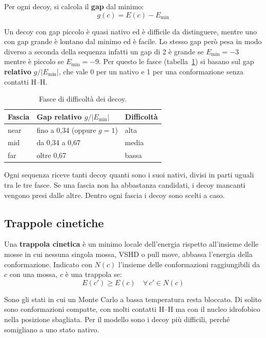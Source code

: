 \documentclass[11pt,a4paper]{article}
\newcommand{\Emin}{E_{\min}}
\begin{document}
Per ogni decoy, si calcola il \textbf{gap} dal minimo:
\begin{equation}
  g(c) = E(c) - \Emin
  \label{eq:gap}
\end{equation}

Un decoy con gap piccolo è quasi nativo ed è difficile da distinguere, mentre uno con gap grande è lontano dal minimo ed è facile. Lo stesso gap però pesa in modo diverso a seconda della sequenza infatti un gap di 2 è grande se $\Emin = -3$ mentre è piccolo se $\Emin = -9$. Per questo le fasce (tabella~\ref{tab:fasce}) si basano sul gap \textbf{relativo} $g / |\Emin|$, che vale 0 per un nativo e 1 per una conformazione senza contatti H--H.

\begin{table}[htbp]
  \centering
  \caption{Fasce di difficoltà dei decoy.}
  \label{tab:fasce}
  \begin{tabular}{lll}
    \toprule
    Fascia & Gap relativo $g / |\Emin|$ & Difficoltà \\
    \midrule
    near & fino a 0,34 (oppure $g = 1$) & alta  \\
    mid  & da 0,34 a 0,67               & media \\
    far  & oltre 0,67                   & bassa \\
    \bottomrule
  \end{tabular}
\end{table}

Ogni sequenza riceve tanti decoy quanti sono i suoi nativi, divisi in parti uguali tra le tre fasce. Se una fascia non ha abbastanza candidati, i decoy mancanti vengono presi dalle altre. Dentro ogni fascia i decoy sono scelti a caso.

\subsection{Trappole cinetiche}
\label{sec:trappole}

Una \textbf{trappola cinetica} è un minimo locale dell'energia rispetto all'insieme delle mosse in cui nessuna singola mossa, VSHD o pull move, abbassa l'energia della conformazione. Indicato con $N(c)$ l'insieme delle conformazioni raggiungibili da $c$ con una mossa, $c$ è una trappola se:
\begin{equation}
  E(c') \ge E(c) \quad \forall\, c' \in N(c)
  \label{eq:trappola}
\end{equation}

Sono gli stati in cui un Monte Carlo a bassa temperatura resta bloccato. Di solito sono conformazioni compatte, con molti contatti H--H ma con il nucleo idrofobico nella posizione sbagliata. Per il modello sono i decoy più difficili, perché somigliano a uno stato nativo.
\end{document}
